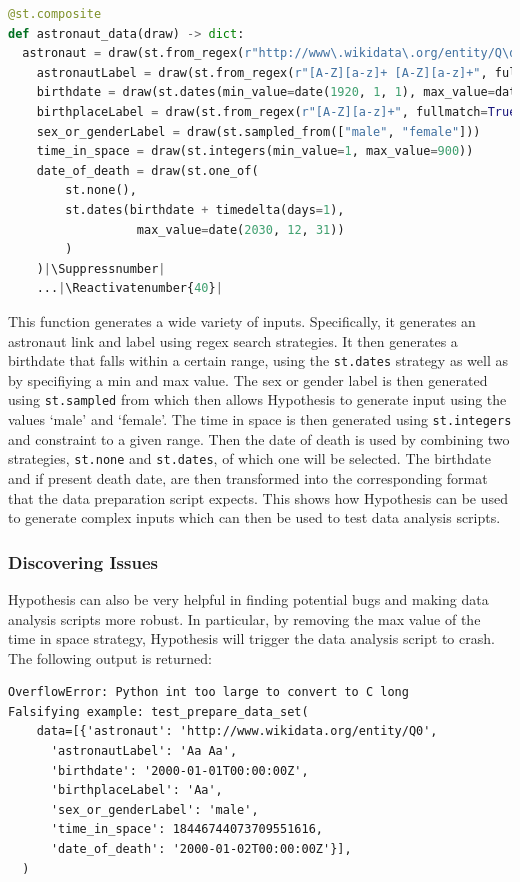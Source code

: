 \documentclass[runningheads]{llncs}
\makeatletter
\let\origthelstnumber\thelstnumber
\newcommand*\Suppressnumber{%
  \lst@AddToHook{OnNewLine}{%
    \let\thelstnumber\relax%
     \advance\c@lstnumber-\@ne\relax%
    }%
}
\newcommand*\Reactivatenumber[1]{%
  \setcounter{lstnumber}{\numexpr#1-1\relax}
  \lst@AddToHook{OnNewLine}{%
   \let\thelstnumber\origthelstnumber%
   \refstepcounter{lstnumber}%
  }%
}
\makeatother
\begin{document}
\begin{lstlisting}[language=Python,caption={Prepare Data Set from code/data\_analysis.ipynb}]
@st.composite
def astronaut_data(draw) -> dict:
  astronaut = draw(st.from_regex(r"http://www\.wikidata\.org/entity/Q\d+", fullmatch=True))
    astronautLabel = draw(st.from_regex(r"[A-Z][a-z]+ [A-Z][a-z]+", fullmatch=True))
    birthdate = draw(st.dates(min_value=date(1920, 1, 1), max_value=date(2030, 12, 31)))
    birthplaceLabel = draw(st.from_regex(r"[A-Z][a-z]+", fullmatch=True))
    sex_or_genderLabel = draw(st.sampled_from(["male", "female"]))
    time_in_space = draw(st.integers(min_value=1, max_value=900)) 
    date_of_death = draw(st.one_of(
        st.none(), 
        st.dates(birthdate + timedelta(days=1), 
                  max_value=date(2030, 12, 31))
        )
    )|\Suppressnumber|
    ...|\Reactivatenumber{40}|

\end{lstlisting}
This function generates a wide variety of inputs. Specifically, it generates an astronaut link and label using regex search strategies. It then generates a birthdate that falls within a certain range, using the \texttt{st.dates} strategy as well as by specifiying a min and max value. The sex or gender label is then generated using \texttt{st.sampled} from which then allows Hypothesis to generate input using the values `male' and `female'. The time in space is then generated using \texttt{st.integers} and constraint to a given range. Then the date of death is used by combining two strategies, \texttt{st.none} and \texttt{st.dates}, of which one will be selected. The birthdate and if present death date, are then transformed into the corresponding format that the data preparation script expects. This shows how Hypothesis can be used to generate complex inputs which can then be used to test data analysis scripts.

\subsubsection{Discovering Issues}
Hypothesis can also be very helpful in finding potential bugs and making data analysis scripts more robust. In particular, by removing the max value of the time in space strategy, Hypothesis will trigger the data analysis script to crash. The following output is returned:

\begin{verbatim}
OverflowError: Python int too large to convert to C long
Falsifying example: test_prepare_data_set(
    data=[{'astronaut': 'http://www.wikidata.org/entity/Q0',
      'astronautLabel': 'Aa Aa',
      'birthdate': '2000-01-01T00:00:00Z',
      'birthplaceLabel': 'Aa',
      'sex_or_genderLabel': 'male',
      'time_in_space': 18446744073709551616,
      'date_of_death': '2000-01-02T00:00:00Z'}],
  )
\end{verbatim}
\end{document}

